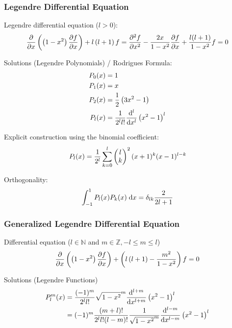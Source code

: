 		\subsubsection{Legendre Differential Equation}
			\noindent
			Legendre differential equation ($l>0$):
			\begin{equation}
				\frac{\partial }{\partial x}\left(\left(1-x^2\right)\frac{\partial f}{\partial x}\right)+l\left(l+1\right)f
				= \frac{\partial^2 f}{\partial x^2} - \frac{2x}{1-x^2}\frac{\partial f}{\partial x} + \frac{l(l+1)}{1-x^2}f = 0
			\end{equation}

			\noindent
			Solutions (Legendre Polynomials) / Rodrigues Formula:
			\begin{equation} \label{Eq:LegendrePolynomials}
				\begin{aligned}
					P_0(x) &= 1 \\
					P_1(x) &= x \\
					P_2(x) &= \frac{1}{2}\left(3x^2-1\right) \\
					P_l(x) &= \frac{1}{2^l l!}\frac{\mathrm{d}^l}{\mathrm{d} x^l}\left(x^2-1\right)^l \\
				\end{aligned}
			\end{equation}

			\noindent
			Explicit construction using the binomial coefficient:
			\begin{equation}
				P_l(x)=\frac{1}{2^l} \sum_{k=0}^{l}\left(\begin{matrix}l\\k\end{matrix}\right)^2(x+1)^k(x-1)^{l-k}
			\end{equation}

			\noindent
			Orthogonality:
			\begin{equation}
				\int_{-1}^1 P_l(x) P_k(x)\;\mathrm{d} x = \delta_{lk} \frac{2}{2l+1}
			\end{equation}

		\subsubsection{Generalized Legendre Differential Equation}
			\noindent
			Differential equation ($l\in\mathbb{N}$ and $m\in\mathbb{Z}, -l\le m\le l$)
			\begin{equation}
				\frac{\partial }{\partial x}\left(\left(1-x^2\right)\frac{\partial f}{\partial x}\right)+\left(l\left(l+1\right)-\frac{m^2}{1-x^2}\right)f= 0
			\end{equation}

			\noindent
			Solutions (Legendre Functions)
			\begin{equation}
				\begin{aligned}
					P_l^m(x) &= \frac{(-1)^m}{2^l l!}\sqrt{1-x^2}^m
					\frac{\mathrm{d}^{l+m}}{\mathrm{d} x^{l+m}}\left(x^2-1\right)^l \\
					&= (-1)^m \frac{(m+l)!}{2^l l! (l-m)!}\frac{1}{\sqrt{1-x^2}^m}
					\frac{\mathrm{d}^{l-m}}{\mathrm{d} x^{l-m}}\left(x^2-1\right)^l \\
				\end{aligned}
			\end{equation}

